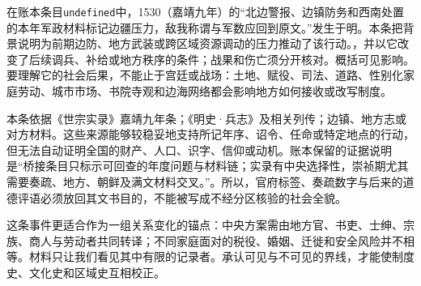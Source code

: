 在账本条目\texttt{undefined}中，1530（嘉靖九年）的“北边警报、边镇防务和西南处置的本年军政材料标记边疆压力，敌我称谓与军数应回到原文。”发生于明。本条把背景说明为前期边防、地方武装或跨区域资源调动的压力推动了该行动。，并以它改变了后续调兵、补给或地方秩序的条件；战果和伤亡须分开核对。概括可见影响。要理解它的社会后果，不能止于宫廷或战场：土地、赋役、司法、道路、性别化家庭劳动、城市市场、书院寺观和边海网络都会影响地方如何接收或改写制度。

本条依据《世宗实录》嘉靖九年条；《明史·兵志》及相关列传；边镇、地方志或对方材料。这些来源能够较稳妥地支持所记年序、诏令、任命或特定地点的行动，但无法自动证明全国的财产、人口、识字、信仰或动机。账本保留的证据说明是“桥接条目只标示可回查的年度问题与材料链；实录有中央选择性，崇祯期尤其需要奏疏、地方、朝鲜及满文材料交叉。”。所以，官府标签、奏疏数字与后来的道德评语必须放回其文书目的，不能被写成不经分区核验的社会全貌。

这条事件更适合作为一组关系变化的锚点：中央方案需由地方官、书吏、士绅、宗族、商人与劳动者共同转译；不同家庭面对的税役、婚姻、迁徙和安全风险并不相等。材料只让我们看见其中有限的记录者。承认可见与不可见的界线，才能使制度史、文化史和区域史互相校正。
